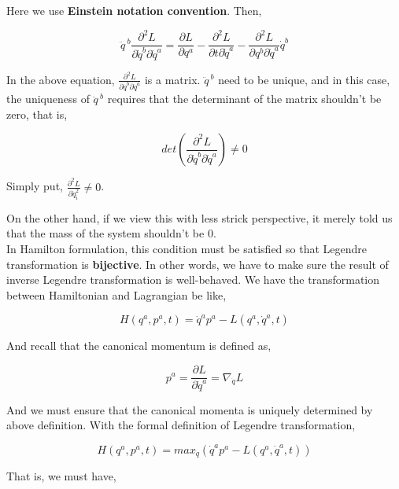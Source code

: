 \documentclass[12pt]{article}
\numberwithin{equation}{section}
\begin{document}
Here we use \textbf{Einstein notation convention}. Then,

\begin{center}
    \[ \ddot{q}^{\ b} \frac{\partial^2 L}{\partial \dot{q}^b \partial \dot{q}^a} = \frac{\partial L}{\partial q^a} - \frac{\partial^2 L}{\partial t \partial \dot{q}^a} - \frac{\partial^2 L}{\partial q^b \partial \dot{q}^a} \dot{q}^b \]
\end{center}

In the above equation, $\frac{\partial^2 L}{\partial \dot{q}^b \partial \dot{q}^a}$ is a matrix. $\ddot{q}^{\ b}$ need to be unique, and in this case, the uniqueness of $\ddot{q}^{\ b}$ requires that the determinant of the matrix shouldn't be zero, that is,

\begin{center}
    \[ det\left(\frac{\partial^2 L}{\partial \dot{q}^b \partial \dot{q}^a}\right) \ne 0\]
\end{center}

Simply put, $\frac{\partial^2 L}{\partial \dot{q}_i^2} \ne 0$.

On the other hand, if we view this with less strick perspective, it merely told us that the mass of the system shouldn't be $0$.
\\
\indent In Hamilton formulation, this condition must be satisfied so that Legendre transformation is \textbf{bijective}. In other words, we have to make sure the result of inverse Legendre transformation is well-behaved. We have the transformation between Hamiltonian and Lagrangian be like,

\begin{center}
    \[ H(q^a, p^a, t) = \dot{q}^ap^a - L(q^a, \dot{q}^a, t) \]
\end{center}

And recall that the canonical momentum is defined as,

\begin{center}
    \[ p^a = \frac{\partial L}{\partial \dot{q}^a} = \nabla_{\dot{q}} L \]
\end{center}

And we must ensure that the canonical momenta is uniquely determined by above definition. With the formal definition of Legendre transformation,

\begin{center}
    \[ H(q^a, p^a, t) = max_{\dot{q}} \left(\dot{q}^ap^a - L(q^a, \dot{q}^a, t)\right) \]
\end{center}

That is, we must have,
\end{document}
